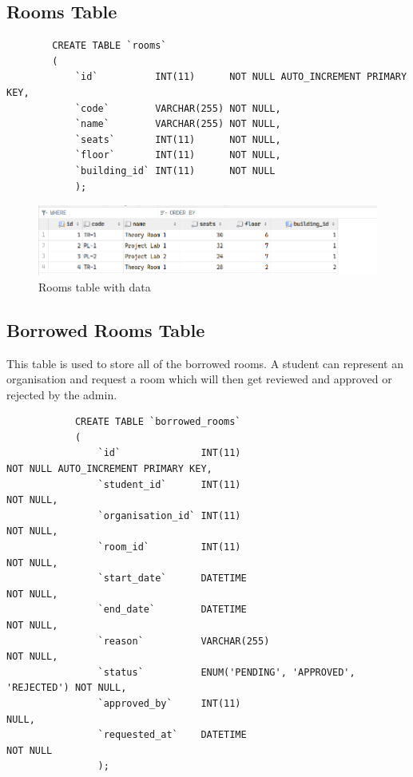 \documentclass[12pt,titlepage]{article}
\begin{document}
    \pagebreak
    
    \subsection{Rooms Table}
    \begin{verbatim}
        CREATE TABLE `rooms`
        (
            `id`          INT(11)      NOT NULL AUTO_INCREMENT PRIMARY KEY,
            `code`        VARCHAR(255) NOT NULL,
            `name`        VARCHAR(255) NOT NULL,
            `seats`       INT(11)      NOT NULL,
            `floor`       INT(11)      NOT NULL,
            `building_id` INT(11)      NOT NULL
            );
        \end{verbatim}
        
        \begin{figure}[h]
            \centering
            \includegraphics[width=\textwidth]{./images/rooms-table.png}
            \caption{Rooms table with data}
        \end{figure}
        
        \subsection{Borrowed Rooms Table}
        This table is used to store all of the borrowed rooms. 
        A student can represent an organisation and request a room which will then get reviewed and approved or rejected by the admin.
        
        \begin{verbatim}
            CREATE TABLE `borrowed_rooms`
            (
                `id`              INT(11)                                 NOT NULL AUTO_INCREMENT PRIMARY KEY,
                `student_id`      INT(11)                                 NOT NULL,
                `organisation_id` INT(11)                                 NOT NULL,
                `room_id`         INT(11)                                 NOT NULL,
                `start_date`      DATETIME                                NOT NULL,
                `end_date`        DATETIME                                NOT NULL,
                `reason`          VARCHAR(255)                            NOT NULL,
                `status`          ENUM('PENDING', 'APPROVED', 'REJECTED') NOT NULL,
                `approved_by`     INT(11)                                 NULL,
                `requested_at`    DATETIME                                NOT NULL
                );
            \end{verbatim}
            
\end{document}
